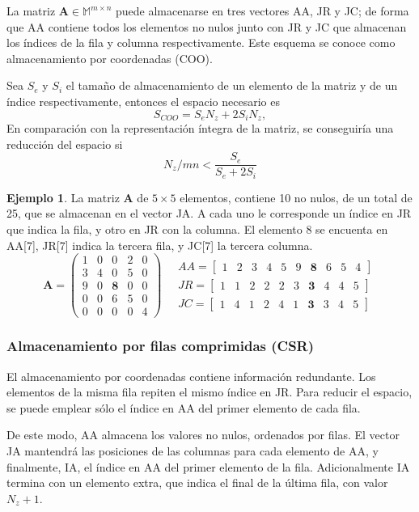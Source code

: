 \documentclass{article}
\newcommand*\mat[1]{ \begin{pmatrix} #1 \end{pmatrix}}
\newcommand*\arr[1]{ \begin{bmatrix} #1 \end{bmatrix}}
\theoremstyle{definition}
\newtheorem{ejemplo}{Ejemplo}[section]
\begin{document}
La matriz $\textbf{A} \in \mathbb{M}^{m\times n}$ puede almacenarse en tres 
vectores AA, JR y JC; de forma que AA contiene todos los elementos no nulos 
junto con JR y JC que almacenan los índices de la fila y columna 
respectivamente. Este esquema se conoce como almacenamiento por coordenadas 
(COO).

Sea $S_e$ y $S_i$ el tamaño de almacenamiento de un elemento de la matriz y de 
un índice respectivamente, entonces el espacio necesario es
$$ S_{COO} = S_eN_z + 2S_iN_z, $$
En comparación con la representación íntegra de la matriz, se conseguiría una 
reducción del espacio si
$$ N_z/mn < \frac{S_e}{S_e + 2S_i} $$

\begin{ejemplo}
La matriz \textbf{A} de $5\times5$ elementos, contiene 10 no nulos, de un total 
de 25, que se almacenan en el vector JA. A cada uno le corresponde un índice en 
JR que indica la fila, y otro en JR con la columna. El elemento 8 se encuenta en 
AA[7], JR[7] indica la tercera fila, y JC[7] la tercera columna.
$$ \textbf{A} = \mat{
	1 & 0 & 0 & 2 & 0 \\
	3 & 4 & 0 & 5 & 0 \\
	9 & 0 & \textbf{8} & 0 & 0 \\
	0 & 0 & 6 & 5 & 0 \\
	0 & 0 & 0 & 0 & 4 }
\quad
\begin{aligned}
	AA = \arr{ 1 & 2 & 3 & 4 & 5 & 9 & \textbf{8} & 6 & 5 & 4} \\
	JR = \arr{ 1 & 1 & 2 & 2 & 2 & 3 & \textbf{3} & 4 & 4 & 5} \\
	JC = \arr{ 1 & 4 & 1 & 2 & 4 & 1 & \textbf{3} & 3 & 4 & 5}
\end{aligned}
$$
\end{ejemplo}

\subsubsection{Almacenamiento por filas comprimidas (CSR)}

El almacenamiento por coordenadas contiene información redundante. Los elementos 
de la misma fila repiten el mismo índice en JR. Para reducir el espacio, se 
puede emplear sólo el índice en AA del primer elemento de cada fila.

De este modo, AA almacena los valores no nulos, ordenados por filas. El vector 
JA mantendrá las posiciones de las columnas para cada elemento de AA, y 
finalmente, IA, el índice en AA del primer elemento de la fila. Adicionalmente 
IA termina con un elemento extra, que indica el final de la última fila, con 
valor $N_z + 1$.
\end{document}

